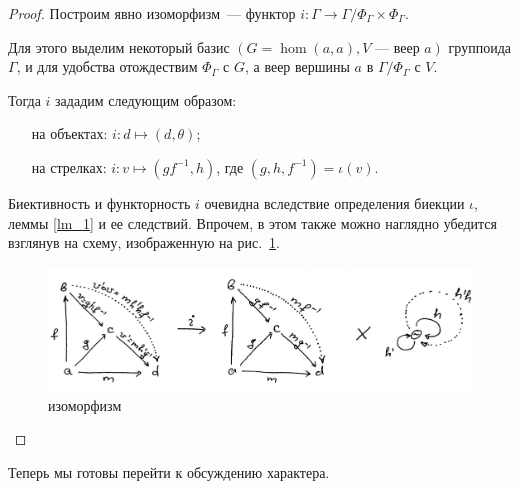     \begin{proof}
    
        Построим явно изоморфизм~--- функтор $i : \Gamma \to 
        \Gamma / \Phi_\Gamma \times \Phi_\Gamma$.

        Для этого выделим некоторый базис $(G = \hom(a,a), V\text{~--- веер } a)$ 
        группоида $\Gamma$, и для удобства отождествим $\Phi_\Gamma$ с $G$, а 
        веер вершины $a$ в $\Gamma / \Phi_\Gamma$ с $V$.

        Тогда $i$ зададим следующим образом:
        \begin{itemize}
            \item [на объектах:] $i : d \mapsto (d,\theta)$;
            \item [на стрелках:] $i : v \mapsto (gf^{-1},h)$, где 
            $(g,h,f^{-1}) = \iota(v)$.
        \end{itemize}

        Биективность и функторность $i$ очевидна вследствие определения 
        биекции $\iota$, леммы \ref{lm_1} и ее следствий. Впрочем, в этом также 
        можно наглядно убедится взглянув на схему, 
        изображенную на рис.~\ref{cd_groupoid_iso}.

        \begin{figure}[h]
            \centering
            \includegraphics[width=\textwidth]{pictures/cd_grp_iso.pdf}
            \caption{изоморфизм}
            \label{cd_groupoid_iso}
        \end{figure}
    \end{proof}

        Теперь мы готовы перейти к обсуждению характера.